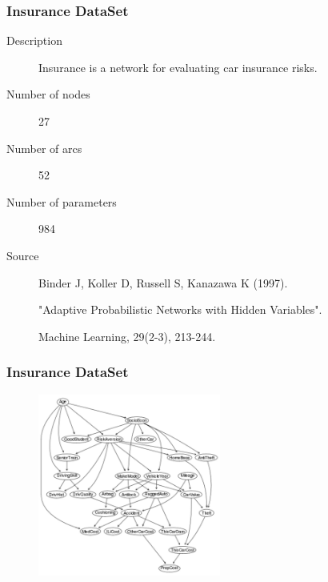\documentclass{beamer}
\begin{document}
\begin{frame}
\frametitle{Insurance DataSet}
{\scriptsize{}
\begin{description}
	\item[Description] Insurance is a network for evaluating car insurance risks.
	
	\item[Number of nodes] 27
	
	\item[Number of arcs] 52
	
	\item[Number of parameters] 984
	
	\item[Source]  Binder J, Koller D, Russell S, Kanazawa K (1997).

	 "Adaptive Probabilistic Networks with Hidden Variables".
	 
	  Machine Learning, 29(2-3), 213-244.
\end{description}
}
\end{frame}



\begin{frame}
\frametitle{Insurance DataSet}
{\scriptsize{}
	\begin{figure}
		\includegraphics[height=170pt]{images/Model_Real_Insurance}
	\end{figure}	
}
\end{frame}
\end{document}
